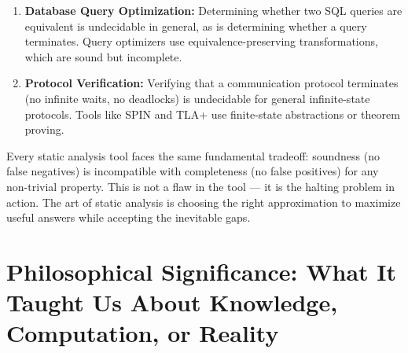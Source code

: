 \begin{enumerate}
\item \textbf{Database Query Optimization:} Determining whether two SQL queries are equivalent is undecidable in general, as is determining whether a query terminates. Query optimizers use equivalence-preserving transformations, which are sound but incomplete.

\item \textbf{Protocol Verification:} Verifying that a communication protocol terminates (no infinite waits, no deadlocks) is undecidable for general infinite-state protocols. Tools like SPIN and TLA+ use finite-state abstractions or theorem proving.
\end{enumerate}

Every static analysis tool faces the same fundamental tradeoff: soundness (no false negatives) is incompatible with completeness (no false positives) for any non-trivial property. This is not a flaw in the tool — it is the halting problem in action. The art of static analysis is choosing the right approximation to maximize useful answers while accepting the inevitable gaps.

\section{Philosophical Significance: What It Taught Us About Knowledge, Computation, or Reality}
\label{sec:halting:philosophy}

